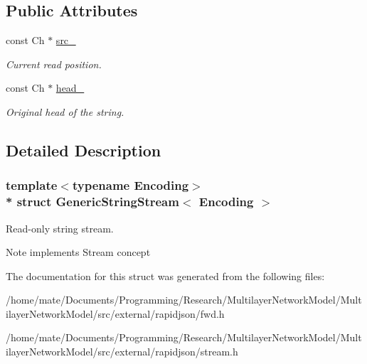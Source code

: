 \subsection*{Public Attributes}
\begin{DoxyCompactItemize}
\item 
const Ch $\ast$ \hyperlink{structGenericStringStream_aeda813798e3f2d6bfdac86afc11b6b80}{src\+\_\+}\hypertarget{structGenericStringStream_aeda813798e3f2d6bfdac86afc11b6b80}{}\label{structGenericStringStream_aeda813798e3f2d6bfdac86afc11b6b80}

\begin{DoxyCompactList}\small\item\em Current read position. \end{DoxyCompactList}\item 
const Ch $\ast$ \hyperlink{structGenericStringStream_a3c86ef1e1f0655028cb8a3afce11ee4f}{head\+\_\+}\hypertarget{structGenericStringStream_a3c86ef1e1f0655028cb8a3afce11ee4f}{}\label{structGenericStringStream_a3c86ef1e1f0655028cb8a3afce11ee4f}

\begin{DoxyCompactList}\small\item\em Original head of the string. \end{DoxyCompactList}\end{DoxyCompactItemize}


\subsection{Detailed Description}
\subsubsection*{template$<$typename Encoding$>$\\*
struct Generic\+String\+Stream$<$ Encoding $>$}

Read-\/only string stream. 

\begin{DoxyNote}{Note}
implements Stream concept 
\end{DoxyNote}


The documentation for this struct was generated from the following files\+:\begin{DoxyCompactItemize}
\item 
/home/mate/\+Documents/\+Programming/\+Research/\+Multilayer\+Network\+Model/\+Multilayer\+Network\+Model/src/external/rapidjson/fwd.\+h\item 
/home/mate/\+Documents/\+Programming/\+Research/\+Multilayer\+Network\+Model/\+Multilayer\+Network\+Model/src/external/rapidjson/stream.\+h\end{DoxyCompactItemize}
